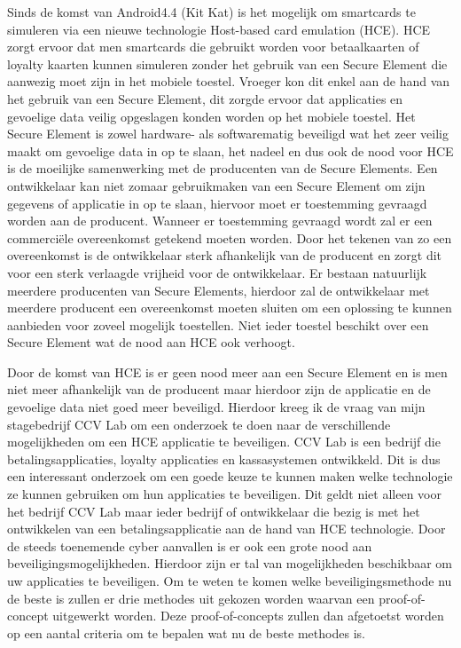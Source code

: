 Sinds de komst van Android4.4 (Kit Kat) is het mogelijk om smartcards te simuleren via een nieuwe technologie Host-based card emulation (HCE). HCE zorgt ervoor dat men smartcards die gebruikt worden voor betaalkaarten of loyalty kaarten kunnen simuleren zonder het gebruik van een Secure Element die aanwezig moet zijn in het mobiele toestel. Vroeger kon dit enkel aan de hand van het gebruik van een Secure Element, dit zorgde ervoor dat applicaties en gevoelige data veilig opgeslagen konden worden op het mobiele toestel. Het Secure Element is zowel hardware- als softwarematig beveiligd wat het zeer veilig maakt om gevoelige data in op te slaan, het nadeel en dus ook de nood voor HCE is de moeilijke samenwerking met de producenten van de Secure Elements. Een ontwikkelaar kan niet zomaar gebruikmaken van een Secure Element om zijn gegevens of applicatie in op te slaan, hiervoor moet er toestemming gevraagd worden aan de producent. Wanneer er toestemming gevraagd wordt zal er een commerciële overeenkomst getekend moeten worden. Door het tekenen van zo een overeenkomst is de ontwikkelaar sterk afhankelijk van de producent en zorgt dit voor een sterk verlaagde vrijheid voor de ontwikkelaar. Er bestaan natuurlijk meerdere producenten van Secure Elements, hierdoor zal de ontwikkelaar met meerdere producent een overeenkomst moeten sluiten om een oplossing te kunnen aanbieden voor zoveel mogelijk toestellen. Niet ieder toestel beschikt over een Secure Element wat de nood aan HCE ook verhoogt.

Door de komst van HCE is er geen nood meer aan een Secure Element en is men niet meer afhankelijk van de producent maar hierdoor zijn de applicatie en de gevoelige data niet goed meer beveiligd. Hierdoor kreeg ik de vraag van mijn stagebedrijf CCV Lab om een onderzoek te doen naar de verschillende mogelijkheden om een HCE applicatie te beveiligen. CCV Lab is een bedrijf die betalingsapplicaties, loyalty applicaties en kassasystemen ontwikkeld. Dit is dus een interessant onderzoek om een goede keuze te kunnen maken welke technologie ze kunnen gebruiken om hun applicaties te beveiligen. Dit geldt niet alleen voor het bedrijf CCV Lab maar ieder bedrijf of ontwikkelaar die bezig is met het ontwikkelen van een betalingsapplicatie aan de hand van HCE technologie. Door de steeds toenemende cyber aanvallen is er ook een grote nood aan beveiligingsmogelijkheden. Hierdoor zijn er tal van mogelijkheden beschikbaar om uw applicaties te beveiligen. Om te weten te komen welke beveiligingsmethode nu de beste is zullen er drie methodes uit gekozen worden waarvan een proof-of-concept uitgewerkt worden. Deze proof-of-concepts zullen dan afgetoetst worden op een aantal criteria om te bepalen wat nu de beste methodes is.

